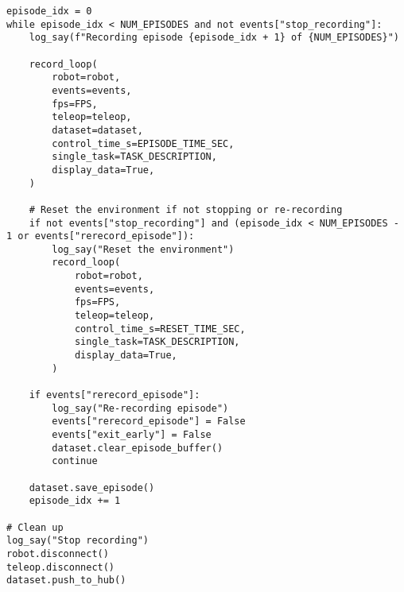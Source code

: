\begin{verbatim}
episode_idx = 0
while episode_idx < NUM_EPISODES and not events["stop_recording"]:
    log_say(f"Recording episode {episode_idx + 1} of {NUM_EPISODES}")

    record_loop(
        robot=robot,
        events=events,
        fps=FPS,
        teleop=teleop,
        dataset=dataset,
        control_time_s=EPISODE_TIME_SEC,
        single_task=TASK_DESCRIPTION,
        display_data=True,
    )

    # Reset the environment if not stopping or re-recording
    if not events["stop_recording"] and (episode_idx < NUM_EPISODES - 1 or events["rerecord_episode"]):
        log_say("Reset the environment")
        record_loop(
            robot=robot,
            events=events,
            fps=FPS,
            teleop=teleop,
            control_time_s=RESET_TIME_SEC,
            single_task=TASK_DESCRIPTION,
            display_data=True,
        )

    if events["rerecord_episode"]:
        log_say("Re-recording episode")
        events["rerecord_episode"] = False
        events["exit_early"] = False
        dataset.clear_episode_buffer()
        continue

    dataset.save_episode()
    episode_idx += 1

# Clean up
log_say("Stop recording")
robot.disconnect()
teleop.disconnect()
dataset.push_to_hub()
\end{verbatim}